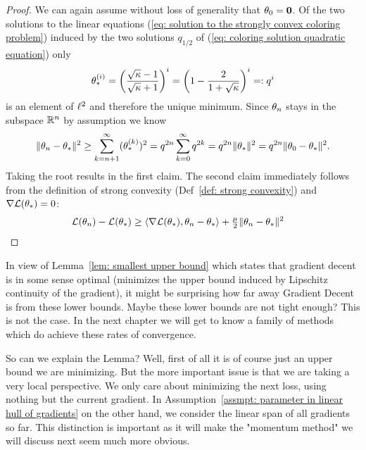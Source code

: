 \begin{proof}
	We can again assume without loss of generality that \(\theta_0=\mathbf{0}\).
	Of the two solutions to the linear equations (\ref{eq: solution to the
	strongly convex coloring problem}) induced by the two solutions \(q_{1/2}\)
	of (\ref{eq: coloring solution quadratic equation}) only
	\begin{align*}
		\theta_*^{(i)} = \left(\frac{\sqrt{\kappa}-1}{\sqrt{\kappa}+1}\right)^i
		= \left(1 - \frac{2}{1+\sqrt{\kappa}}\right)^i =: q^i
	\end{align*}
	is an element of \(\ell^{2}\) and therefore the unique minimum. Since 
	\(\theta_n\) stays in the subspace \(\mathbb{R}^n\) by assumption we know
	\begin{align*}
		\|\theta_n -\theta_*\|^2
		\ge \sum_{k=n+1}^\infty (\theta_*^{(k)})^2
		= q^{2n} \sum_{k=0}^\infty q^{2k}
		= q^{2n} \| \theta_*\|^2
		= q^{2n} \|\theta_0 - \theta_*\|^2.
	\end{align*}
	Taking the root results in the first claim. The second claim immediately
	follows from the definition of strong convexity (Def~\ref{def: strong convexity})
	and \(\nabla\mathcal{L}(\theta_*) = 0\):
	\begin{align*}
		\mathcal{L}(\theta_n) - \mathcal{L}(\theta_*)
		&\ge \langle \nabla\mathcal{L}(\theta_*), \theta_n -\theta_*\rangle
		+\tfrac{\mu}{2} \|\theta_n -\theta_*\|^2
		\qedhere
	\end{align*}
\end{proof}

In view of Lemma~\ref{lem: smallest upper bound} which states that gradient
decent is in some sense optimal (minimizes the upper bound induced by
Lipschitz continuity of the gradient), it might be surprising how far away
Gradient Decent is from these lower bounds. Maybe these lower bounds are not
tight enough? This is not the case. In the next chapter we will get to know
a family of methods which do achieve these rates of convergence.

So can we
explain the Lemma? Well, first of all it is of course just an upper bound we
are minimizing. But the more important issue is that we are taking a very
local perspective. We only care about minimizing the next loss, using 
nothing but the current gradient. In Assumption~\ref{assmpt: parameter in
linear hull of gradients} on the other hand, we consider the linear span of all
gradients so far. This distinction is important as it will make the
"momentum method" we will discuss next seem much more obvious.

